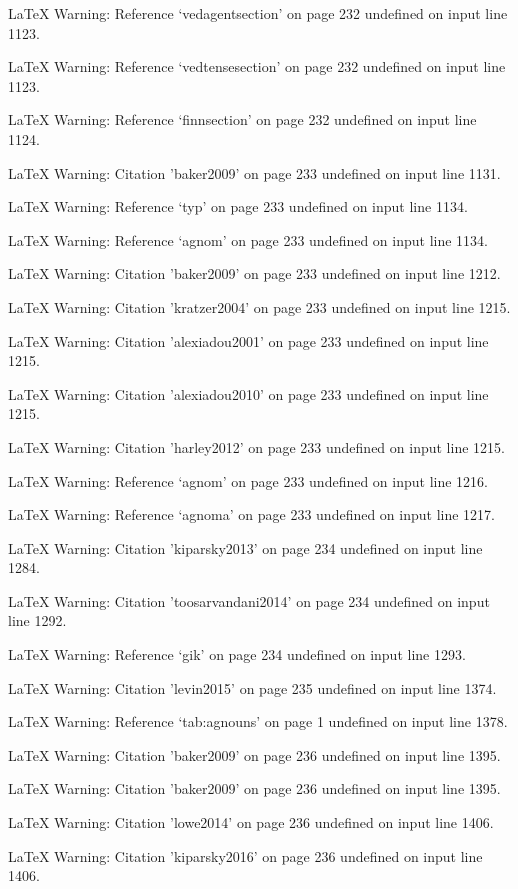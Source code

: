 LaTeX Warning: Reference `vedagentsection' on page 232 undefined on input line 1123.


LaTeX Warning: Reference `vedtensesection' on page 232 undefined on input line 1123.


LaTeX Warning: Reference `finnsection' on page 232 undefined on input line 1124.


LaTeX Warning: Citation 'baker2009' on page 233 undefined on input line 1131.


LaTeX Warning: Reference `typ' on page 233 undefined on input line 1134.


LaTeX Warning: Reference `agnom' on page 233 undefined on input line 1134.


LaTeX Warning: Citation 'baker2009' on page 233 undefined on input line 1212.


LaTeX Warning: Citation 'kratzer2004' on page 233 undefined on input line 1215.


LaTeX Warning: Citation 'alexiadou2001' on page 233 undefined on input line 1215.


LaTeX Warning: Citation 'alexiadou2010' on page 233 undefined on input line 1215.


LaTeX Warning: Citation 'harley2012' on page 233 undefined on input line 1215.


LaTeX Warning: Reference `agnom' on page 233 undefined on input line 1216.


LaTeX Warning: Reference `agnoma' on page 233 undefined on input line 1217.


LaTeX Warning: Citation 'kiparsky2013' on page 234 undefined on input line 1284.


LaTeX Warning: Citation 'toosarvandani2014' on page 234 undefined on input line 1292.


LaTeX Warning: Reference `gik' on page 234 undefined on input line 1293.


LaTeX Warning: Citation 'levin2015' on page 235 undefined on input line 1374.


LaTeX Warning: Reference `tab:agnouns' on page 1 undefined on input line 1378.


LaTeX Warning: Citation 'baker2009' on page 236 undefined on input line 1395.


LaTeX Warning: Citation 'baker2009' on page 236 undefined on input line 1395.


LaTeX Warning: Citation 'lowe2014' on page 236 undefined on input line 1406.


LaTeX Warning: Citation 'kiparsky2016' on page 236 undefined on input line 1406.


